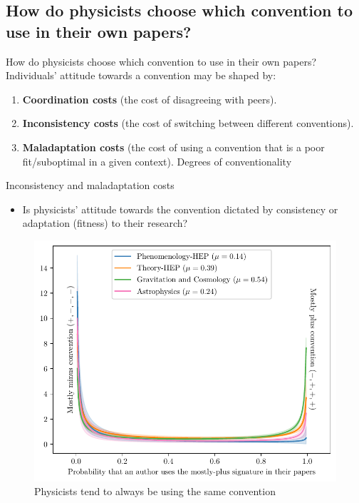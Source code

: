 \documentclass[10pt]{beamer}
\begin{document}
\subsection{How do physicists choose which convention to use in their own papers?}

\begin{frame}{How do physicists choose which convention to use in their own papers?}
Individuals' attitude towards a convention may be shaped by:

    \begin{enumerate}
        \item<2-> \textbf{Coordination costs} (the cost of disagreeing with peers).
        \item<3-> \textbf{Inconsistency costs} (the cost of switching between different conventions).
        \item<4-> \textbf{Maladaptation costs} (the cost of using a convention that is a poor fit/suboptimal in a given context). Degrees of conventionality \citep{OConnor2020}
    \end{enumerate}

\end{frame}

\begin{frame}{Inconsistency and maladaptation costs}
\begin{itemize}
    \item<1-> Is physicists' attitude towards the convention dictated by consistency or adaptation (fitness) to their research?
\end{itemize}

\begin{figure}
\centering
\includegraphics[width=0.5\linewidth]{preferences.pdf}
    \caption{Physicists tend to always be using the same convention}
\end{figure}
\end{frame}
\end{document}
